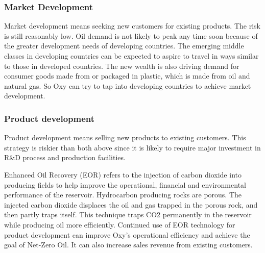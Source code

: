 \documentclass[
	a4paper, %
	12pt,%
]{CSSullivanBusinessReport}
\begin{document}
\begin{fullwidth}
\subsubsection{Market Development}
Market development means seeking new customers for existing products. The risk is still reasonably low.
Oil demand is not likely to peak any time soon because of the greater development needs of developing countries. The emerging middle classes in developing countries can be expected to aspire to travel in ways similar to those in developed countries. The new wealth is also driving demand for consumer goods made from or packaged in plastic, which is made from oil and natural gas. So Oxy can try to tap into developing countries to achieve market development.
\subsubsection{Product development}
Product development means selling new products to existing customers. This strategy is riskier than both above since it is likely to require major investment in R&D process and production facilities.\par
Enhanced Oil Recovery (EOR) refers to the injection of carbon dioxide into producing fields to help improve the operational, financial and environmental performance of the reservoir. Hydrocarbon producing rocks are porous. The injected carbon dioxide displaces the oil and gas trapped in the porous rock, and then partly traps itself. This technique traps CO2 permanently in the reservoir while producing oil more efficiently. Continued use of EOR technology for product development can improve Oxy’s operational efficiency and achieve the goal of Net-Zero Oil. It can also increase sales revenue from existing customers. 

\end{fullwidth}
\end{document}
